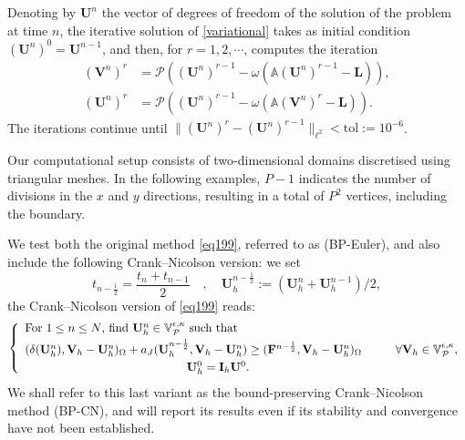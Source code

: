 \documentclass[final,12pt]{amsart}
\theoremstyle{plain}
\theoremstyle{definition}
\newcommand\calP{{\mathcal{P}}}
\newcommand\bU{\mathbf{U}}
\newcommand\bV{\mathbf{V}}
\begin{document}
Denoting by $\mathbf{\bU}^{n}$ the vector of degrees of freedom of the solution of the problem at time $n$, the iterative solution of \eqref{variational} takes as initial condition
$(\mathbf{\bU}^{n})^0=\mathbf{\bU}^{n-1}$, and then, for $r=1,2,\cdots$, computes the iteration
\begin{equation}
\begin{aligned}\label{iterative12}
	(\mathbf{\bV}^{n})^r &= \mathcal{P}\left((\mathbf{\bU}^{n})^{r-1} - \omega\left(\mathbb{A} (\mathbf{\bU}^{n})^{r-1} - \mathbf{L}\right)\right),  \\
	(\mathbf{\bU}^{n})^r &= \mathcal{P}\left((\mathbf{\bU}^{n})^{r-1} - \omega\left(\mathbb{A} (\mathbf{\bV}^{n})^r - \mathbf{L}\right)\right).
\end{aligned}
\end{equation}
The iterations continue until $\|(\mathbf{\bU}^{n})^r - (\mathbf{\bU}^{n})^{r-1}\|_{\ell^2} < \text{tol} := 10^{-6}$. 

Our computational setup consists of two-dimensional domains discretised using triangular meshes. In the following examples, $P-1$ indicates the number of divisions in the $x$ and
$y$ directions, resulting in a total of $P^2$ vertices, including the
boundary. 

We test both the original method \eqref{eq199},  referred to as (BP-Euler), and also include the following Crank--Nicolson
version: we set
\begin{equation*}
 t_{n-\frac{1}{2}} = \frac{t_{n}+t_{n-1}}{2}\quad,\quad 
 \mathbf{U}_{h}^{n-\frac{1}{2}} := (\mathbf{U}_{h}^{n} +\mathbf{U}_{h}^{n-1})/2,
\end{equation*}
the Crank--Nicolson version of \eqref{eq199} reads:
\begin{equation}
	\left\{ \begin{array}{ll}
		\text{For $1\leq n \leq N$, find $\mathbf{U}_h^n \in \mathbb{V}_{\calP}^{\epsilon,\kappa}$ such that}\vspace{.1cm}
		\\  
		(\delta (\mathbf{U}_{h}^{n}),\mathbf{V}_{h}-\mathbf{U}_{h}^{n})_{\Omega} + a_{J}(\mathbf{U}_{h}^{n-\frac{1}{2}},\mathbf{V}_{h}-\mathbf{U}_{h}^{n}) \geq (\mathbf{F}^{n-\frac{1}{2}},\mathbf{V}_{h}-\mathbf{U}_{h}^{n})_{\Omega} \hspace{1cm} \forall \mathbf{V}_{h}\in \mathbb{V}_{\calP}^{\epsilon,\kappa}, \vspace{.1cm}\\
		\hspace{4.8cm} \mathbf{U}_{h}^{0} = \mathbf{I}_{h}\mathbf{U}^{0}.
	\end{array} \right.\label{eq199CN}
\end{equation}
We shall refer to this last variant as the bound-preserving Crank--Nicolson method (BP-CN), and will report its results even if its stability and convergence have not been established.
\end{document}
